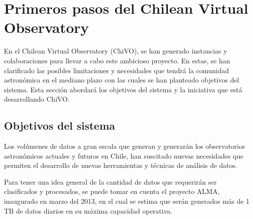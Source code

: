 \section{Primeros pasos del Chilean Virtual Observatory}

En el Chilean Virtual Observatory (ChiVO), se han generado instancias y colaboraciones
para llevar a cabo este ambicioso proyecto. En estas, se han clarificado las
posibles limitaciones y necesidades que tendrá la comunidad astronómica en
el mediano plazo con las cuales se han planteado objetivos del sistema. Esta
sección abordará los objetivos del sistema y la iniciativa que está desarrollando ChiVO.

\subsection{Objetivos del sistema}

Los volúmenes de datos a gran escala que generan y generarán los observatorios
astronómicos actuales y futuros en Chile, han suscitado nuevas necesidades que
permiten el desarrollo de nuevas herramientas y técnicas de análisis de datos.

Para tener una idea general de la cantidad de datos que requerirán ser
clasificados y procesados, se puede tomar en cuenta el proyecto ALMA,
inaugurado en marzo del 2013, en el cual se estima que serán generados más de 1
TB de datos diarios en su máxima capacidad operativa.

